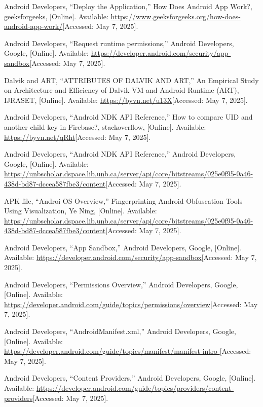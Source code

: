 \documentclass[12pt]{report}
\begin{document}
\begin{thebibliography}{1}
  Android Developers, “Deploy the Application,” How Does Android App Work?, geeksforgeeks, [Online]. Available: \url{https://www.geeksforgeeks.org/how-does-android-app-work/}[Accessed: May 7, 2025].

  Android Developers, “Request runtime permissions,” Android Developers, Google, [Online]. Available: \url{https://developer.android.com/security/app-sandbox}[Accessed: May 7, 2025].
 
  Dalvik and ART, “ATTRIBUTES OF DALVIK AND ART,” An Empirical Study on Architecture and Efficiency of Dalvik VM and Android Runtime (ART), IJRASET, [Online]. Available: \url{https://byvn.net/u13X}[Accessed: May 7, 2025].

  Android Developers, “Android NDK API Reference,” How to compare UID and another child key in Firebase?, stackoverflow, [Online]. Available: \url{https://byvn.net/qRht}[Accessed: May 7, 2025].

  Android Developers, “Android NDK API Reference,” Android Developers, Google, [Online]. Available: \url{https://unbscholar.dspace.lib.unb.ca/server/api/core/bitstreams/025e0f95-0a46-438d-bd87-dccea587fbe3/content}[Accessed: May 7, 2025].

  APK file, “Androi OS Overview,” Fingerprinting Android Obfuscation Tools Using Visualization, Ye Ning, [Online]. Available: \url{https://unbscholar.dspace.lib.unb.ca/server/api/core/bitstreams/025e0f95-0a46-438d-bd87-dccea587fbe3/content}[Accessed: May 7, 2025].

  Android Developers, “App Sandbox,” Android Developers, Google, [Online]. Available: \url{https://developer.android.com/security/app-sandbox}[Accessed: May 7, 2025].
  
  Android Developers, “Permissions Overview,” Android Developers, Google, [Online]. Available: \url{https://developer.android.com/guide/topics/permissions/overview}[Accessed: May 7, 2025].
  
  Android Developers, “AndroidManifest.xml,” Android Developers, Google, [Online]. Available: \url{https://developer.android.com/guide/topics/manifest/manifest-intro }[Accessed: May 7, 2025].
   
  Android Developers, “Content Providers,” Android Developers, Google, [Online]. Available: \url{https://developer.android.com/guide/topics/providers/content-providers}[Accessed: May 7, 2025].
  

\end{thebibliography}
\end{document}
